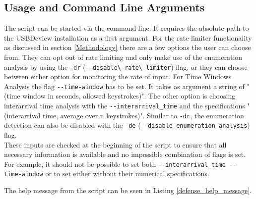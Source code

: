 \subsection{Usage and Command Line Arguments} \label{Usage and Command Line Argumets}

The script can be started via the command line. It requires the absolute path to the USBDeview installation as a first argument. For the rate limiter functionality as discussed in section \ref{Methodology} there are a few options the user can choose from. They can opt out of rate limiting and only make use of the enumeration analysis by using the \verb|-dr| (\verb|--disable\_rate\_limiter|) flag, or they can choose between either option for monitoring the rate of input. For Time Windows Analysis the flag \verb|--time-window| has to be set. It takes as argument a string of "(time window in seconds, allowed keystrokes)". The other option is choosing interarrival time analysis with the \verb|--interarrival_time| and the specifications "(interarrival time, average over n keystrokes)". Similar to \verb|-dr|, the enumeration detection can also be disabled with the \verb|-de| (\verb|--disable_enumeration_analysis|) flag.  \\
These inputs are checked at the beginning of the script to ensure that all necessary information is available and no impossible combination of flags is set. For example, it should not be possible to set both 
\verb|--interarrival_time --time-window| or to set either without their numerical specifications. 

The help message from the script can be seen in Listing \ref{defense_help_message}.


